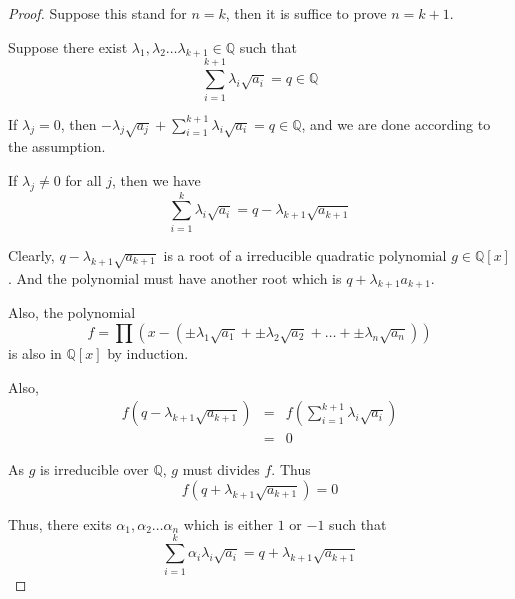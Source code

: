 \documentclass{article}
\begin{document}
    \begin{proof}
        Suppose this stand for $ n=k $, then it is suffice to prove $ n=k+1 $.

        Suppose there exist $ \lambda_{1}, \lambda_{2} \dots \lambda_{k+1} \in \mathbb{Q} $
        such that
        \begin{equation*}
            \sum_{i=1}^{k+1} \lambda_{i}\sqrt{a_{i}} = q \in \mathbb{Q}
        \end{equation*}

        If $\lambda_{j} = 0 $, then
        $ -\lambda_{j}\sqrt{a_{j}} + \sum_{i=1}^{k+1} \lambda_{i}\sqrt{a_{i}} = q \in \mathbb{Q} $,
        and we are done according to the assumption.

        If $\lambda_{j} \neq 0 $ for all $j$, then we have
        \begin{equation*}
            \sum_{i=1}^{k} \lambda_{i}\sqrt{a_{i}} = q - \lambda_{k+1}\sqrt{a_{k+1}}
        \end{equation*}

        Clearly, $ q - \lambda_{k+1}\sqrt{a_{k+1}} $
        is a root of a irreducible quadratic polynomial $ g \in \mathbb{Q}[x] $.
        And the polynomial must have another root which is $ q + \lambda_{k+1}a_{k+1} $.

        Also, the polynomial
        \begin{equation*}
            f = \prod (x - ( \pm \lambda_{1}\sqrt{a_{1}} + \pm \lambda_{2}\sqrt{a_{2}} + \dots + \pm \lambda_{n}\sqrt{a_{n}} ))
        \end{equation*}
        is also in $ \mathbb{Q}[x] $ by induction.

        Also, 
        \begin{eqnarray*}
            f( q - \lambda_{k+1}\sqrt{a_{k+1}} ) &=& f( \sum_{i=1}^{k+1} \lambda_{i}\sqrt{a_{i}} ) \\
            &=& 0
        \end{eqnarray*}

        As $ g $ is irreducible over $ \mathbb{Q} $,
        $ g $ must divides $f$. Thus
        \begin{equation*}
            f( q + \lambda_{k+1}\sqrt{a_{k+1}} ) = 0
        \end{equation*}

        Thus, there exits $ \alpha_{1}, \alpha_{2} \dots \alpha_{n} $
        which is either $ 1 $ or $ -1 $ such that
        \begin{equation*}
            \sum_{i=1}^{k} \alpha_{i} \lambda_{i}\sqrt{a_{i}} = q + \lambda_{k+1}\sqrt{a_{k+1}}
        \end{equation*}


\end{proof}
\end{document}
